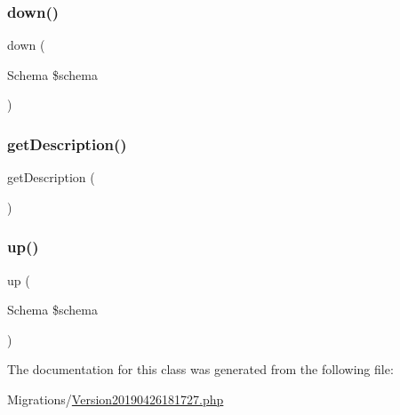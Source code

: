 \subsubsection{\texorpdfstring{down()}{down()}}
{\footnotesize\ttfamily down (\begin{DoxyParamCaption}\item[{Schema}]{\$schema }\end{DoxyParamCaption})}

\mbox{\label{class_doctrine_migrations_1_1_version20190426181727_a2e7bb35c71bf1824456ceb944cb7a845}} 
\subsubsection{\texorpdfstring{getDescription()}{getDescription()}}
{\footnotesize\ttfamily get\+Description (\begin{DoxyParamCaption}{ }\end{DoxyParamCaption})}

\mbox{\label{class_doctrine_migrations_1_1_version20190426181727_a23eb1c1428e8ea2ab2cf798fc06ec421}} 
\subsubsection{\texorpdfstring{up()}{up()}}
{\footnotesize\ttfamily up (\begin{DoxyParamCaption}\item[{Schema}]{\$schema }\end{DoxyParamCaption})}



The documentation for this class was generated from the following file\+:\begin{DoxyCompactItemize}
\item 
Migrations/\mbox{\hyperlink{_version20190426181727_8php}{Version20190426181727.\+php}}\end{DoxyCompactItemize}
